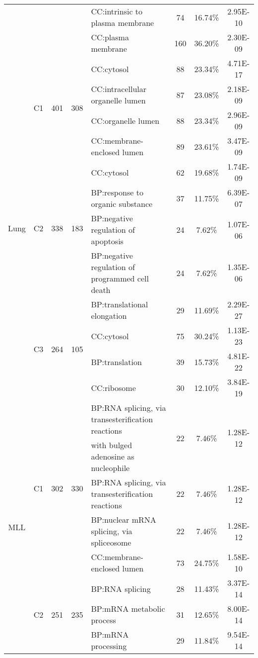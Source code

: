 \begin{table*}[!htb]
\begin{tabular}{c|c|cclccc}
&&&&CC:intrinsic to plasma membrane & 74 & 16.74\% & 2.95E-10\\
&&&&CC:plasma membrane & 160 & 36.20\% & 2.30E-09\\
\hline
\multirow{12}{*}{Lung} &\multirow{4}{*}{C1}& \multirow{4}{*}{401} &\multirow{4}{*}{308}
&CC:cytosol & 88 & 23.34\% & 4.71E-17\\
&&&&CC:intracellular organelle lumen & 87 & 23.08\% & 2.18E-09\\
&&&&CC:organelle lumen & 88 & 23.34\% & 2.96E-09\\
&&&&CC:membrane-enclosed lumen & 89 & 23.61\% & 3.47E-09\\
\cline{2-8}
&\multirow{4}{*}{C2}& \multirow{4}{*}{338} &\multirow{4}{*}{183}
&CC:cytosol & 62 & 19.68\% & 1.74E-09\\
&&&&BP:response to organic substance & 37 & 11.75\% & 6.39E-07\\
&&&&BP:negative regulation of apoptosis & 24 & 7.62\% & 1.07E-06\\
&&&&BP:negative regulation of programmed cell death & 24 & 7.62\% & 1.35E-06\\
\cline{2-8}
&\multirow{4}{*}{C3}& \multirow{4}{*}{264} &\multirow{4}{*}{105}
&BP:translational elongation & 29 & 11.69\% & 2.29E-27\\
&&&&CC:cytosol & 75 & 30.24\% & 1.13E-23\\
&&&&BP:translation & 39 & 15.73\% & 4.81E-22\\
&&&&CC:ribosome & 30 & 12.10\% & 3.84E-19\\
\hline
\multirow{13}{*}{MLL} &\multirow{5}{*}{C1}& \multirow{5}{*}{302} &\multirow{5}{*}{330}
& BP:RNA splicing, via transesterification reactions & \multirow{2}{*}{22} & \multirow{2}{*}{7.46\% }& \multirow{2}{*}{1.28E-12}\\
 &&& & with bulged adenosine as nucleophile &  &  & \\
&&&&BP:RNA splicing, via transesterification reactions & 22 & 7.46\% & 1.28E-12\\
&&&&BP:nuclear mRNA splicing, via spliceosome & 22 & 7.46\% & 1.28E-12\\
&&&&CC:membrane-enclosed lumen & 73 & 24.75\% & 1.58E-10\\
\cline{2-8}
&\multirow{4}{*}{C2}& \multirow{4}{*}{251} &\multirow{4}{*}{235}
&   BP:RNA splicing & 28 & 11.43\% & 3.37E-14\\
&&&&BP:mRNA metabolic process & 31 & 12.65\% & 8.00E-14\\
&&&&BP:mRNA processing & 29 & 11.84\% & 9.54E-14\\

\end{tabular}
\end{table*}
